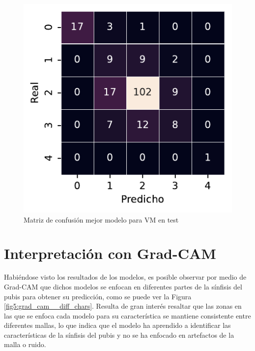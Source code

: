 \begin{figure}[htbp]
    \includegraphics[width=0.75\linewidth]{figures/5_experiments/single-vm-cm.pdf}
    \caption{Matriz de confusión mejor modelo para VM en test}
    \label{fig5:VM_confusion_matrix}
\end{figure}

\FloatBarrier

\section{Interpretación con Grad-CAM}
Habiéndose visto los resultados de los modelos, es posible observar por medio de Grad-CAM que dichos modelos se enfocan en diferentes partes de la sínfisis del pubis para obtener su predicción, como se puede ver la Figura \ref{fig5:grad_cam__diff_chars}. Resulta de gran interés resaltar que las zonas en las que se enfoca cada modelo para su característica se mantiene consistente entre diferentes mallas, lo que indica que el modelo ha aprendido a identificar las características de la sínfisis del pubis y no se ha enfocado en artefactos de la malla o ruido.

